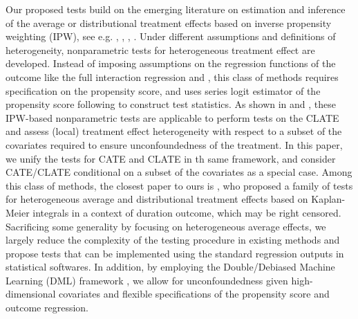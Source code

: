 \documentclass[
  12pt,
  12pt]{article}
\numberwithin{equation}{section}
\theoremstyle{definition}
\theoremstyle{plain}
\theoremstyle{plain}
\theoremstyle{remark}
\begin{document}
Our proposed tests build on the emerging literature on estimation and
inference of the average or distributional treatment effects based on
inverse propensity weighting (IPW), see e.g.
\citet{abrevaya2015estimating}, \citet{chang2015nonparametric},
\citet{hsu2017consistent}, \citet{sant2021nonparametric}. Under
different assumptions and definitions of heterogeneity, nonparametric
tests for heterogeneous treatment effect are developed. Instead of
imposing assumptions on the regression functions of the outcome like the
full interaction regression and \citet{crump2008nonparametric}, this
class of methods requires specification on the propensity score, and
uses series logit estimator of the propensity score following
\citet{hirano2003efficient} to construct test statistics. As shown in
\citet{hsu2017consistent} and \citet{sant2021nonparametric}, these
IPW-based nonparametric tests are applicable to perform tests on the
CLATE and assess (local) treatment effect heterogeneity with respect to
a subset of the covariates required to ensure unconfoundedness of the
treatment. In this paper, we unify the tests for CATE and CLATE in th
same framework, and consider CATE/CLATE conditional on a subset of the
covariates as a special case. Among this class of methods, the closest
paper to ours is \citet{sant2021nonparametric}, who proposed a family of
tests for heterogeneous average and distributional treatment effects
based on Kaplan-Meier integrals in a context of duration outcome, which
may be right censored. Sacrificing some generality by focusing on
heterogeneous average effects, we largely reduce the complexity of the
testing procedure in existing methods and propose tests that can be
implemented using the standard regression outputs in statistical
softwares. In addition, by employing the Double/Debiased Machine
Learning (DML) framework \citep{chernozhukov2018double}, we allow for
unconfoundedness given high-dimensional covariates and flexible
specifications of the propensity score and outcome regression.
\end{document}
